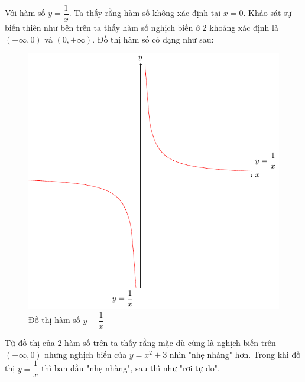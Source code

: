 \begin{example}
    Với hàm số $y = \dfrac{1}{x}$. Ta thấy rằng hàm số không xác
    định tại $x=0$. Khảo sát sự biến thiên như bên trên ta thấy
    hàm số nghịch biến ở 2 khoảng xác định là $(-\infty, 0)$
    và $(0, +\infty)$. Đồ thị hàm số có dạng như sau:
    \begin{figure}[ht]
        \centering
        \includegraphics[scale=0.75]{../pics/algebra/algebra3.pdf}
        \caption{Đồ thị hàm số $y = \dfrac{1}{x}$}
    \end{figure}
\end{example}

Từ đồ thị của 2 hàm số trên ta thấy rằng mặc dù cùng là nghịch biến
trên $(-\infty, 0)$ nhưng nghịch biến của $y=x^2+3$ nhìn "nhẹ nhàng" hơn. Trong khi 
đồ thị $y = \dfrac{1}{x}$ thì ban đầu "nhẹ nhàng", sau thì như
"rơi tự do".
